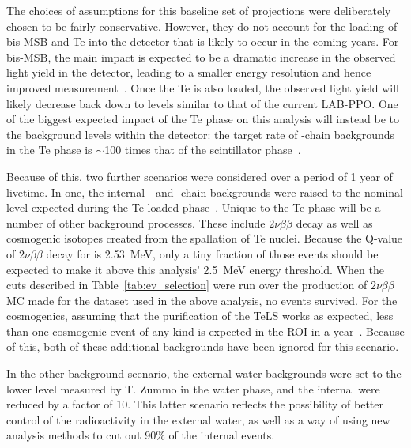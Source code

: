 The choices of assumptions for this baseline set of projections were deliberately chosen to be fairly conservative. However, they do not account for the loading of bis-MSB and Te into the detector that is likely to occur in the coming years. For bis-MSB, the main impact is expected to be a dramatic increase in the observed light yield in the detector, leading to a smaller energy resolution and hence improved measurement~\cite{albaneseSNOExperiment2021}. %
Once the Te is also loaded, the observed light yield will likely decrease back down to levels similar to that of the current LAB-PPO. One of the biggest expected impact of the Te phase on this analysis will instead be to the background levels within the detector: the target rate of -chain backgrounds in the Te phase is $\sim$100 times that of the scintillator phase~\cite{andringaCurrentStatusFuture2016}. %

Because of this, two further scenarios were considered over a period of 1 year of livetime. In one, the internal - and -chain backgrounds were raised to the nominal level expected during the Te-loaded phase~\cite{kroupovaImprovingSensitivityNeutrinoless2020}. %
Unique to the Te phase will be a number of other background processes. These include $2\nu\beta\beta$ decay as well as cosmogenic isotopes created from the spallation of Te nuclei. Because the Q-value of $2\nu\beta\beta$ decay for  is \SI{2.53}{\MeV}, only a tiny fraction of those events should be expected to make it above this analysis' \SI{2.5}{\MeV} energy threshold. When the cuts described in Table~\ref{tab:ev_selection} were run over the production of $2\nu\beta\beta$ MC made for the dataset used in the above analysis, no events survived. For the cosmogenics, assuming that the purification of the TeLS works as expected, less than one cosmogenic event of any kind is expected in the \onbb{} ROI in a year~\cite{kroupovaImprovingSensitivityNeutrinoless2020}. %
Because of this, both of these additional backgrounds have been ignored for this scenario.

In the other background scenario, the external water backgrounds were set to the lower level measured by T. Zummo in the water phase, and the internal  were reduced by a factor of 10. This latter scenario reflects the possibility of better control of the radioactivity in the external water, as well as a way of using new analysis methods to cut out 90\% of the internal  events.

